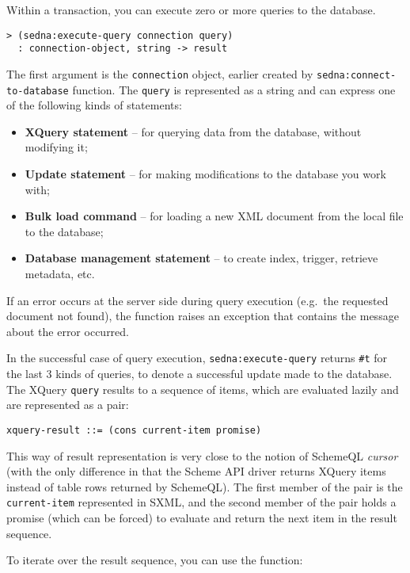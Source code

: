 \documentclass[a4paper,12pt]{article}
\newenvironment{citemize}
{\begin{itemize}
  \setlength{\itemsep}{0pt}
  \setlength{\parskip}{0pt}
  \setlength{\parsep}{0pt}}
{\end{itemize}}
\begin{document}
Within a transaction, you can execute zero or more queries to the database.

\begin{verbatim}
> (sedna:execute-query connection query)
  : connection-object, string -> result
\end{verbatim}

The first argument is the \texttt{connection} object, earlier created by
\texttt{sedna:connect-to-database} function. The \texttt{query} is represented
as a string and can express one of the following kinds of statements:

\begin{citemize}
\item \textbf{XQuery statement} -- for querying data from the database, without
modifying it;
\item \textbf{Update statement} -- for making modifications to the database you
work with;
\item \textbf{Bulk load command} -- for loading a new XML document from the
local file to the database;
\item \textbf{Database management statement} -- to create index, trigger,
retrieve metadata, etc.
\end{citemize}

If an error occurs at the server side during query execution (e.g.\ the
requested document not found), the function raises an exception that contains
the message about the error occurred.

In the successful case of query execution, \texttt{sedna:execute-query} returns
\texttt{\#t} for the last 3 kinds of queries, to denote a successful update made
to the database. The XQuery \texttt{query} results to a sequence of items, which
are evaluated lazily and are represented as a pair:

\begin{verbatim}
xquery-result ::= (cons current-item promise)
\end{verbatim}

\noindent
This way of result representation is very close to the notion of SchemeQL {\em
cursor}~\cite{paper:scheme-ql} (with the only difference in that the Scheme API
driver returns XQuery items instead of table rows returned by SchemeQL). The
first member of the pair is the \texttt{current-item} represented in SXML, and
the second member of the pair holds a promise (which can be forced) to evaluate
and return the next item in the result sequence.

To iterate over the result sequence, you can use the function:
\end{document}
